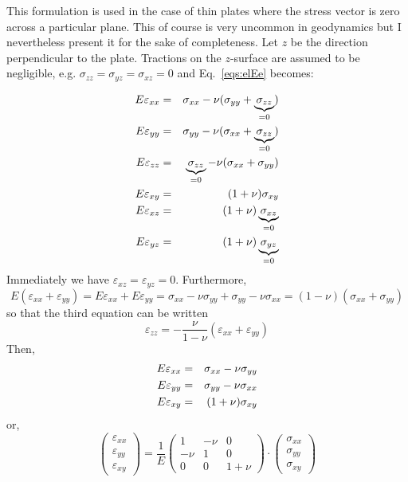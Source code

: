 This formulation is used in the case of thin plates where
the stress vector is zero across a particular plane.
This of course is very uncommon in geodynamics but I nevertheless 
present it for the sake of completeness.
Let $z$ be the direction perpendicular to the plate.
Tractions  on the $z$-surface are assumed to be negligible, e.g.
$\sigma_{zz}=\sigma_{yz}=\sigma_{xz}=0$ and Eq.~\eqref{eqs:elEe} becomes:

\begin{eqnarray}
E \varepsilon_{xx} &=&  \sigma_{xx} - \nu (\sigma_{yy}+\underbrace{\sigma_{zz}}_{=0}) \nonumber\\
E \varepsilon_{yy} &=&  \sigma_{yy} - \nu (\sigma_{xx}+\underbrace{\sigma_{zz}}_{=0}) \nonumber\\
E \varepsilon_{zz} &=&  \underbrace{\sigma_{zz}}_{=0} - \nu (\sigma_{xx}+\sigma_{yy}) \nonumber\\
E \varepsilon_{xy} &=&  (1+\nu) \sigma_{xy} \nonumber\\
E \varepsilon_{xz} &=&  (1+\nu) \underbrace{\sigma_{xz}}_{=0} \nonumber\\
E \varepsilon_{yz} &=&  (1+\nu) \underbrace{\sigma_{yz}}_{=0} \nonumber 
\end{eqnarray}
Immediately we have $\varepsilon_{xz}=\varepsilon_{yz}=0$.
Furthermore, 
\[
E(\varepsilon_{xx}+\varepsilon_{yy}) 
=E\varepsilon_{xx}+E\varepsilon_{yy} 
=  \sigma_{xx} - \nu \sigma_{yy} +  \sigma_{yy} - \nu \sigma_{xx} 
= (1-\nu)(\sigma_{xx}+\sigma_{yy})
\]
so that the third equation can be written
\[
\varepsilon_{zz} = -\frac{\nu}{1-\nu} ( \varepsilon_{xx}+\varepsilon_{yy})
\]
Then, 
\begin{eqnarray}
E \varepsilon_{xx} &=&  \sigma_{xx} - \nu \sigma_{yy} \nonumber\\
E \varepsilon_{yy} &=&  \sigma_{yy} - \nu \sigma_{xx} \nonumber\\
E \varepsilon_{xy} &=&  (1+\nu) \sigma_{xy} 
\end{eqnarray}
or,
\begin{equation}
\left(
\begin{array}{c}
\varepsilon_{xx}\\
\varepsilon_{yy}\\
\varepsilon_{xy}
\end{array}
\right)
=\frac1E
\left(
\begin{array}{ccc}
1 & -\nu & 0 \\
-\nu & 1 & 0 \\
0 & 0 & 1+\nu
\end{array}
\right)
\cdot
\left(
\begin{array}{c}
\sigma_{xx}\\
\sigma_{yy}\\
\sigma_{xy}
\end{array}
\right)
\end{equation}
